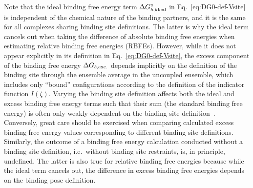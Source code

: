 \documentclass[9pt,bestpractices]{livecoms}
\begin{document}
Note that the ideal binding free energy term $\Delta G^\circ_{b,{\rm ideal}}$ in Eq.~\ref{eq:DG0-def-Vsite} is independent of the chemical nature of the binding partners, and it is the same for all complexes sharing binding site definitions. The latter is why the ideal term cancels out when taking the difference of absolute binding free energies when estimating relative binding free energies (RBFEs). However, while it does not appear explicitly in its definition in Eq.~\ref{eq:DG0-def-Vsite}, the excess component of the binding free energy $\Delta G_{b,{\rm exc.}}$ depends implicitly on the definition of the binding site through the ensemble average in the uncoupled ensemble, which includes only ``bound'' configurations according to the definition of the indicator function $I(\zeta)$. Varying the binding site definition affects both the ideal and excess binding free energy terms such that their sum (the standard binding free energy) is often only weakly dependent on the binding site definition~\cite{gilson1997statisticalthermodynamic,gallicchio2011recent}. Conversely, great care should be exercised when comparing calculated excess binding free energy values corresponding to different binding site definitions. Similarly, the outcome of a binding free energy calculation conducted without a binding site definition, i.e.\ without binding site restraints, is, in principle, undefined. The latter is also true for relative binding free energies because while the ideal term cancels out, the difference in excess binding free energies depends on the binding pose definition. 
\end{document}
